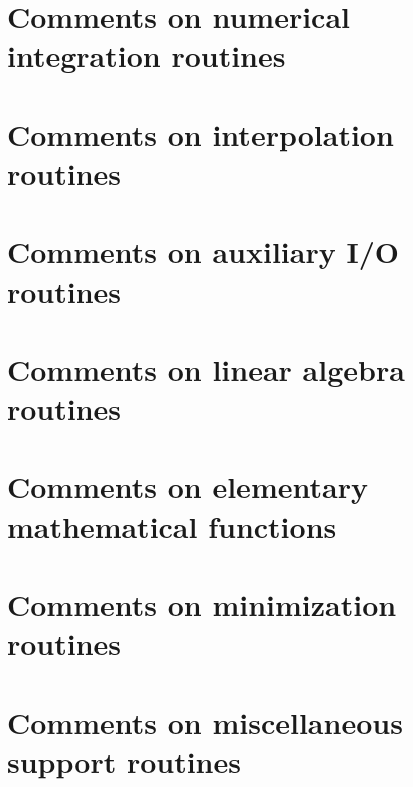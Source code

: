 \documentclass[twoside]{book}
\newcommand{\+}{\discretionary{\mbox{\scriptsize$\hookleftarrow$}}{}{}}
\begin{document}
\chapter{Comments on numerical integration routines}
\label{Comments_01on_01numerical_01integration_01routines}
\hypertarget{Comments_01on_01numerical_01integration_01routines}{}

\chapter{Comments on interpolation routines}
\label{Comments_01on_01interpolation_01routines}
\hypertarget{Comments_01on_01interpolation_01routines}{}

\chapter{Comments on auxiliary I/\+O routines}
\label{Comments_01on_01auxiliary_01I_2O_01routines}
\hypertarget{Comments_01on_01auxiliary_01I_2O_01routines}{}

\chapter{Comments on linear algebra routines}
\label{Comments_01on_01linear_01algebra_01routines}
\hypertarget{Comments_01on_01linear_01algebra_01routines}{}

\chapter{Comments on elementary mathematical functions}
\label{Comments_01on_01elementary_01mathematical_01functions}
\hypertarget{Comments_01on_01elementary_01mathematical_01functions}{}

\chapter{Comments on minimization routines}
\label{Comments_01on_01minimization_01routines}
\hypertarget{Comments_01on_01minimization_01routines}{}

\chapter{Comments on miscellaneous support routines}
\label{Comments_01on_01miscellaneous_01support_01routines}
\hypertarget{Comments_01on_01miscellaneous_01support_01routines}{}

\end{document}
